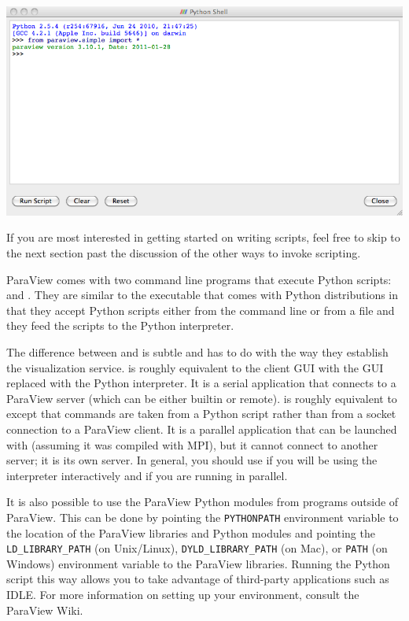 \begin{inlinefig}
  \includegraphics[width=\scw]{images/PythonShellDialog}
\end{inlinefig}

If you are most interested in getting started on writing scripts,
feel free to skip to the next section past the discussion of the other ways
to invoke scripting.

ParaView comes with two command line programs that execute Python scripts:
 and .  They are similar to the
 executable that comes with Python distributions in
that they accept Python scripts either from the command line or from a file
and they feed the scripts to the Python interpreter.

The difference between  and  is
subtle and has to do with the way they establish the visualization
service.   is roughly equivalent to the
 client GUI with the GUI replaced with the Python
interpreter.  It is a serial application that connects to a ParaView server
(which can be either builtin or remote).   is roughly
equivalent to  except that commands are taken from a
Python script rather than from a socket connection to a ParaView client.  
It is a
parallel application that can be launched with  (assuming
it was compiled with MPI), but it cannot connect to another server; it is
its own server.  In general, you should use  if you
will be using the interpreter interactively and  if
you are running in parallel.

It is also possible to use the ParaView Python modules from programs
outside of ParaView.  This can be done by pointing the \texttt{PYTHONPATH}
environment variable to the location of the ParaView libraries and Python
modules and pointing the \texttt{LD\_LIBRARY\_PATH} (on Unix/Linux),
\texttt{DYLD\_LIBRARY\_PATH} (on Mac), or \texttt{PATH} (on Windows)
environment variable to the ParaView libraries.  Running the Python script
this way allows you to take advantage of third-party applications such as
IDLE.  For more information on setting up your environment, consult the
ParaView Wiki.

